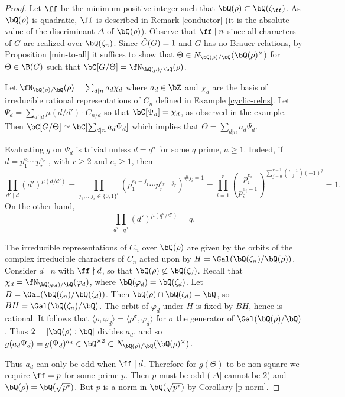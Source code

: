 \begin{proof}
    Let $\ff$ be the minimum positive integer such that $\bQ(\rho) \subset \bQ(\zeta_{\ff})$. As $\bQ(\rho)$ is quadratic, $\ff$ is described in Remark \ref{conductor} (it is the absolute value of the discriminant $\Delta$ of $\bQ(\rho)$). Observe that $\ff \mid n$ since all characters of $G$ are realized over $\bQ(\zeta_n)$. Since $\hat{C}(G) = 1$ and $G$ has no Brauer relations, by Proposition \ref{min-to-all} it suffices to show that $\Theta \in \fieldnorm{\rho}$ for $\Theta \in \B(G)$ such that $\bC[G / \Theta] = \repnorm{\rho}$.


    Let $\repnorm{\rho} = \sum_{d \mid n} a_d \chi_d$ where $a_d \in \bZ$ and $\chi_d$ are the basis of irreducible rational representations of $C_n$ defined in Example \ref{cyclic-relns}. %
    Let $\Psi_{d} = \sum_{d' | d}\mu(d / d')\cdot C_{n / d}$ so that $\bC[\Psi_{d}] = \chi_{d}$, as observed in the example. Then $\bC[G / \Theta] \simeq \bC[\sum_{d | n } a_{d} \Psi_{d}]$ which implies that $\Theta = \sum_{d | n } a_{d} \Psi_{d}$.

    Evaluating $g$ on $\Psi_{d}$ is trivial unless $d = q^a$ for some $q$ prime, $a \geq 1$. Indeed, if $d = p_1^{e_1} \cdots p_r^{e_r}$ , with $r \geq 2$ and $e_i \geq 1$, then
    \[ \prod_{d' \mid d} (d')^{\mu(d / d')} = \prod_{j_1, \ldots j_r \in \{0,1\}^r } \left(p_1^{e_1 - j_1} \cdots p_r^{e_r - j_r}\right)^{\# j_i = 1} = \prod_{i = 1}^r \left(\frac{p_i^{e_i}}{p_i^{e_i - 1}}\right)^{\sum_{ j = 0}^{r - 1} \binom{r-1}{j} (-1)^j} = 1. \]
    On the other hand,
    \[ \prod_{d' \mid q^a} (d')^{\mu(q^a / d')} = q .\]
    
    The irreducible representations of $C_n$ over $\bQ(\rho)$ are given by the orbits of the complex irreducible characters of $C_n$ acted upon by $H = \Gal (\bQ(\zeta_n) / \bQ(\rho))$. Consider $d \mid n$ with $\ff \nmid d$, so that $\bQ(\rho) \not\subset \bQ(\zeta_d)$. 
    Recall that $\chi_d = \repnorm{\varphi_d}$, where $\bQ(\varphi_d) = \bQ(\zeta_d)$. Let $B = \Gal(\bQ(\zeta_n) / \bQ(\zeta_d))$. Then $\bQ(\rho) \cap \bQ(\zeta_d) = \bQ$, so $BH = \Gal(\bQ(\zeta_n) / \bQ)$. The orbit of $\varphi_{d}$ under $H$ is fixed by $BH$, hence is rational. It follows that $\langle \rho, \varphi_{d} \rangle = \langle \rho^{\sigma} , \varphi_{d} \rangle$ for $\sigma$ the generator of $\Gal(\bQ(\rho) / \bQ)$. Thus $2 = [\bQ(\rho) : \bQ]$ divides $a_d$, and so $g(a_d \Psi_d) = g(\Psi_d)^{a_d} \in \bQ^{\times 2} \subset \fieldnorm{\rho}$.

    Thus $a_d$ can only be odd when $\ff \mid d$. Therefore for $g(\Theta)$ to be non-square we require $\ff = p$ for some prime $p$. Then $p$ must be odd ($|\Delta|$ cannot be $2$) and $\bQ(\rho) = \bQ(\sqrt{p^*})$. But $p$ is a norm in $\bQ(\sqrt{p^*})$ by Corollary \ref{p-norm}.
\end{proof}

